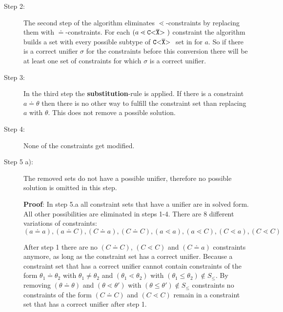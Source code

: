 \documentclass[runningheads]{llncs}
\begin{document}
\begin{description}
\item[Step 2:]
The second step of the algorithm eliminates $\lessdot$-constraints
by replacing them with $\doteq$-constraints.
For each $(a \lessdot \mathtt{C {\tt <} \overline{\tt X} {\tt >} \ })$ constraint the algorithm builds a set with every
possible subtype of $\mathtt{C {\tt <} \overline{\tt X} {\tt >} \ }$ set in for $a$.
So if there is a correct unifier $\sigma$ for the constraints before this conversion there will be at least one set of
constraints for which $\sigma$ is a correct unifier.

\item[Step 3:]
In the third step the \textbf{substitution}-rule is applied.
If there is a constraint $a \doteq \theta$ then there is no other way to fulfill the constraint set
than replacing $a$ with $\theta$.
This does not remove a possible solution.

\item[Step 4:]
None of the constraints get modified.

\item[Step 5 a):]
The removed sets do not have a possible unifier, therefore no possible solution is
omitted in this step.

\textbf{Proof}:
In step 5.a all constraint sets that have a unifier are in solved form.
All other possibilities are eliminated in steps 1-4.
There are 8 different variations of constraints:\\
$(a \doteq a), (a \doteq C), (C \doteq a), (C \doteq C), (a \lessdot a), (a \lessdot C), (C \lessdot a), (C \lessdot C)$

After step 1 there are no $(C \doteq C)$, $(C \lessdot C)$ and $(C \doteq a)$ constraints anymore,
as long as the constraint set has a correct unifier.
Because a constraint set that has a correct unifier cannot contain constraints of the form $\theta_1 \doteq \theta_2$ with $\theta_1 \neq \theta_2$ and
$(\theta_1 \lessdot \theta_2)$ with $(\theta_1 \leq \theta_2) \notin S_\leq$.
By removing $(\theta \doteq \theta)$ and $(\theta \lessdot \theta')$ with $(\theta \leq \theta') \notin S_\leq$ constraints
no constraints of the form $(C \doteq C)$ and $(C \lessdot C)$
remain in a constraint set that has a correct unifier after step 1.


\end{description}
\end{document}
